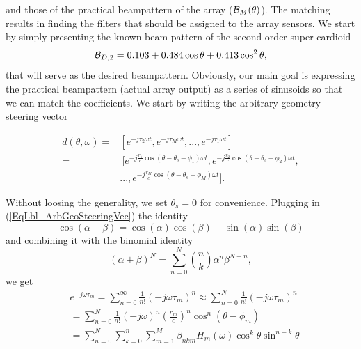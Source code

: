 \documentclass{article}
\begin{document}
and those of the practical beampattern of the array ($ {\cal B}_M(\theta) $). The matching results in finding the filters that should be assigned to the array sensors. We start by simply presenting the known \cite{sps15} beam pattern of the second order super-cardioid 
\begin{equation}
{\cal B}_{D,2}=0.103+0.484\cos{\theta}+0.413\cos^2{\theta},
\end{equation} 
that will serve as the desired beampattern. Obviously, our main goal is expressing the practical beampattern (actual array output) as a series of sinusoids so that we can match the coefficients. We start by writing the arbitrary geometry steering vector 
\begin{center}
	\begin{equation}\label{EqLbl_ArbGeoSteeringVec}
		\begin{split}
			d(\theta,\omega)=&\left[e^{-j\tau_2\omega t},e^{-j\tau_M\omega t},...,e^{-j\tau_1\omega t} \right] \\ %
			=&\ [e^{-j\frac{r_1}{c}\cos{(\theta-\theta_s-\phi_1)}\omega t} ,e^{-j\frac{r_2}{c}\cos{(\theta-\theta_s-\phi_2)}\omega t},
			\\&...,e^{-j\frac{r_M}{c}\cos{(\theta-\theta_s-\phi_M)}\omega t}]. %
		\end{split}
	\end{equation}
\end{center}
Without loosing the generality, we set $ \theta_s=0 $ for convenience. Plugging in (\ref{EqLbl_ArbGeoSteeringVec}) the identity
\begin{equation}
	\cos(\alpha-\beta)=\cos(\alpha)\cos(\beta)+\sin(\alpha)\sin(\beta)
\end{equation}
and combining it with the binomial identity 
\begin{equation}\label{EqLbl_BinomDef}
	(\alpha+\beta)^N=\sum_{n=0}^{N}{\binom{n}{k}\alpha^{n}\beta^{N-n}},
\end{equation}
we get
\begin{equation}\label{EqLbl_SteerVecExp}
	\begin{split}
		& e^{-j\omega\tau_m}=\sum_{n=0}^{\infty}\frac{1}{n!}(-j\omega\tau_m)^n\approx\sum_{n=0}^{N}\frac{1}{n!}(-j\omega\tau_m)^n\\
		& 
		=\sum_{n=0}^{N}\frac{1}{n!}(-j\omega)^n(\frac{r_m}{c})^n\cos^n{(\theta-\phi_m)}\\
		& %
		=\sum_{n=0}^{N}\sum_{k=0}^{n}\sum_{m=1}^{M}\beta_{nkm}H_m(\omega)\cos^k{\theta}\sin^{n-k}{\theta}
	\end{split}
\end{equation}
\end{document}
